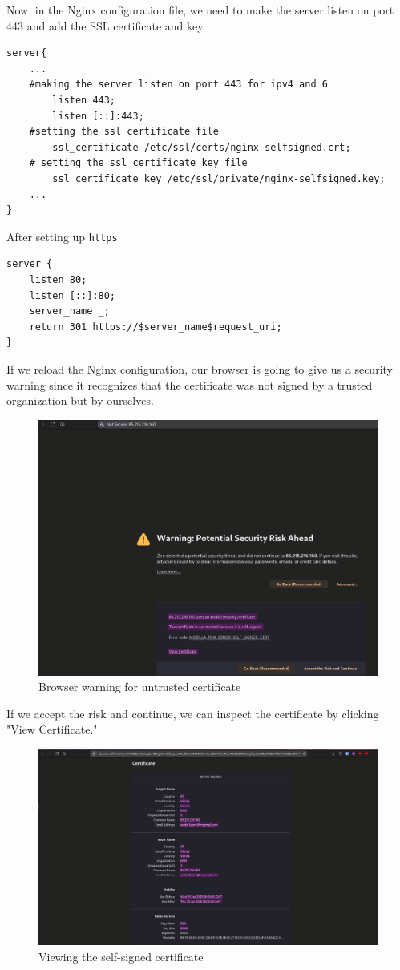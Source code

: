 \documentclass[a4paper]{article}
\newcommand{\abc}{\hfill \break}
\begin{document}
Now, in the Nginx configuration file, we need to make the server listen on port 443 and add the SSL certificate and key.
\begin{lstlisting}
server{
	...
	#making the server listen on port 443 for ipv4 and 6
        listen 443;
        listen [::]:443;
	#setting the ssl certificate file
        ssl_certificate /etc/ssl/certs/nginx-selfsigned.crt;
	# setting the ssl certificate key file
        ssl_certificate_key /etc/ssl/private/nginx-selfsigned.key;
	...
}
\end{lstlisting}
After setting up \texttt{https}
\begin{lstlisting}
server {
	listen 80;
	listen [::]:80;
	server_name _;
	return 301 https://$server_name$request_uri;	
}
\end{lstlisting}
\newpage
If we reload the Nginx configuration, our browser is going to give us a security warning since it recognizes that the certificate was not signed by a trusted organization but by ourselves. \begin{figure}[!htbp]
	\includegraphics[scale=0.25]{images/unseccert.png}
	\centering
	\caption{Browser warning for untrusted certificate}
\end{figure}\abc
If we accept the risk and continue, we can inspect the certificate by clicking "View Certificate."
\begin{figure}[!htbp]
	\includegraphics[scale=0.2]{images/selfcert.png}
	\centering
	\caption{Viewing the self-signed certificate}
\end{figure}
\end{document}
